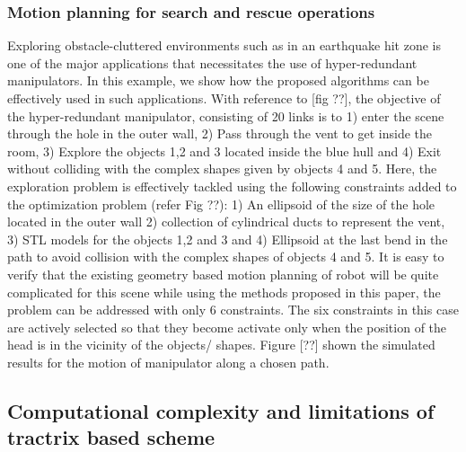 \documentclass[12pt,a4]{article}
\begin{document}
\subsubsection{Motion planning for search and rescue operations}
Exploring obstacle-cluttered environments such as in an earthquake hit zone is one of the major applications that necessitates the use of hyper-redundant manipulators. In this example, we show how the proposed algorithms can be effectively used in such applications. With reference to [fig ??], the objective of the hyper-redundant manipulator, consisting of 20 links is to 1) enter the scene through the hole in the outer wall, 2) Pass through the vent to get inside the room, 3) Explore the objects 1,2 and 3 located inside the blue hull and 4) Exit without colliding with the complex shapes given by objects 4 and 5. Here, the exploration problem is effectively tackled using the following constraints added to the optimization problem (refer Fig ??): 1) An ellipsoid of the size of the hole located in the outer wall 2) collection of cylindrical ducts to represent the vent, 3) STL models for the objects 1,2 and 3 and 4) Ellipsoid at the last bend in the path to avoid collision with the complex shapes of objects 4 and 5. It is easy to verify that the existing geometry based motion planning of robot will be quite complicated for this scene while using the methods proposed in this paper, the problem can be addressed with only 6 constraints. The six constraints in this case are actively selected so that they become activate only when the position of the head is in the vicinity of the objects/ shapes. Figure [??] shown the simulated results for the motion of manipulator along a chosen path. 

\subsection{Computational complexity and limitations of tractrix based scheme}
\end{document}
